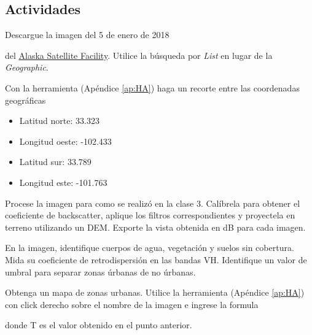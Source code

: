 \subsection{Actividades}

\begin{que}
    Descargue la imagen del 5 de enero de 2018
    \begin{center}\end{center}
      del \href{https://vertex.daac.asf.alaska.edu/}{Alaska Satellite Facility}. Utilice la búsqueda por \emph{List} en lugar de la \emph{Geographic}.
\end{que}

\begin{que}
    Con la herramienta  (Apéndice \ref{ap:HA}) haga un recorte entre las coordenadas geográficas
    \begin{itemize}
        \item Latitud norte: 33.323
        \item Longitud oeste: -102.433
        \item Latitud sur: 33.789
        \item Longitud este: -101.763
    \end{itemize}
\end{que}

\begin{que}
    Procese la imagen para como se realizó en la clase 3. Calíbrela para obtener el coeficiente de backscatter, aplique los filtros correspondientes y proyectela en terreno utilizando un DEM. Exporte la vista obtenida en dB para cada imagen.
\end{que}

\begin{que}
    En la imagen, identifique cuerpos de agua, vegetación y suelos sin cobertura. Mida su coeficiente de retrodispersión en las bandas VH. Identifique un valor de umbral para separar zonas úrbanas de no úrbanas.
\end{que}

\begin{que}
  Obtenga un mapa de zonas urbanas. Utilice la herramienta  (Apéndice \ref{ap:HA}) con click derecho sobre el nombre de la imagen e ingrese la formula
  \begin{center}
  \end{center}
  donde T es el valor obtenido en el punto anterior.
\end{que}

